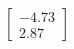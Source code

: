 \documentclass[preview]{standalone}
\begin{document}
\begin{align*}
\begin{bmatrix} -4.73 \\ 2.87 \end{bmatrix}
\end{align*}
\end{document}
